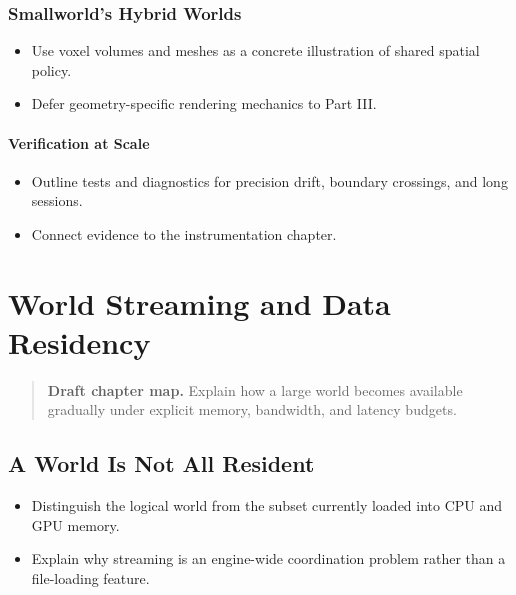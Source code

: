 \documentclass[
  11pt,
  letterpaper,
  DIV=11,
  numbers=noendperiod,
  twoside,
  open=right]{scrreprt}
\providecommand{\tightlist}{%
  \setlength{\itemsep}{0pt}\setlength{\parskip}{0pt}}
\begin{document}
\subsection{Smallworld's Hybrid Worlds}\label{smallworlds-hybrid-worlds}

\begin{itemize}
\tightlist
\item
  Use voxel volumes and meshes as a concrete illustration of shared
  spatial policy.
\item
  Defer geometry-specific rendering mechanics to Part III.
\end{itemize}

\subsubsection{Verification at Scale}\label{verification-at-scale}

\begin{itemize}
\tightlist
\item
  Outline tests and diagnostics for precision drift, boundary crossings,
  and long sessions.
\item
  Connect evidence to the instrumentation chapter.
\end{itemize}

\chapter{World Streaming and Data
Residency}\label{world-streaming-and-data-residency}

\begin{quote}
\textbf{Draft chapter map.} Explain how a large world becomes available
gradually under explicit memory, bandwidth, and latency budgets.
\end{quote}

\section{A World Is Not All Resident}\label{a-world-is-not-all-resident}

\begin{itemize}
\tightlist
\item
  Distinguish the logical world from the subset currently loaded into
  CPU and GPU memory.
\item
  Explain why streaming is an engine-wide coordination problem rather
  than a file-loading feature.
\end{itemize}
\end{document}
